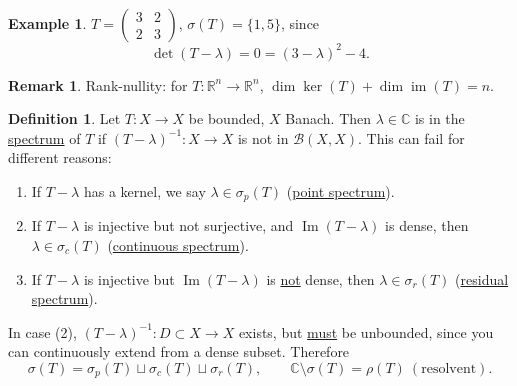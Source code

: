 \documentclass[12pt]{article}
\DeclareMathOperator{\im}{im}
\renewcommand{\Im}{\operatorname{Im}}
\newcommand{\R}{\mathbb{R}}
\newcommand{\C}{\mathbb{C}}
\newcommand{\cB}{\mathcal{B}}
\theoremstyle{definition}
\newtheorem{defn}[thm]{Definition}
\newtheorem{ex}[thm]{Example}
\newtheorem{rmk}[thm]{Remark}
\begin{document}
\begin{ex}
	$T = \begin{pmatrix} 3 & 2 \\ 2 & 3 \end{pmatrix}$, $\sigma(T) = \lbrace 1, 5 \rbrace$, since
	\begin{equation*}
		\det(T - \lambda) = 0 = (3-\lambda)^2 - 4.
	\end{equation*}
\end{ex}

\begin{rmk}
	Rank-nullity: for $T : \R^n \to \R^n$, $\dim \ker(T) + \dim \im(T) = n$.
\end{rmk}

\begin{defn}
	Let $T : X \to X$ be bounded, $X$ Banach.
	Then $\lambda \in \C$ is in the \underline{spectrum} of $T$ if $(T-\lambda)^{-1} : X \to X$ is not in $\cB(X,X)$.
	This can fail for different reasons:
	\begin{enumerate}[nosep]
		\item If $T - \lambda$ has a kernel, we say $\lambda \in \sigma_p(T)$ (\underline{point spectrum}).
		\item If $T - \lambda$ is injective but not surjective, and $\Im(T-\lambda)$ is dense, then $\lambda \in \sigma_c(T)$ (\underline{continuous spectrum}).
		\item If $T - \lambda$ is injective but $\Im(T - \lambda)$ is \underline{not} dense, then $\lambda \in \sigma_r(T)$ (\underline{residual spectrum}).
	\end{enumerate}
\end{defn}

\noindent In case (2), $(T-\lambda)^{-1} : D \subset X \to X$ exists, but \underline{must} be unbounded, since you can continuously extend from a dense subset.
Therefore
\begin{equation*}
	\sigma(T) = \sigma_p(T) \sqcup \sigma_c(T) \sqcup \sigma_r(T), \qquad \C \setminus \sigma(T) = \rho(T) \ (\text{resolvent}).
\end{equation*}
\end{document}
